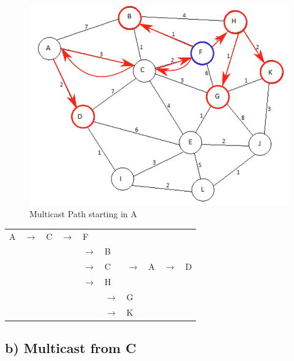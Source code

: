 \documentclass[a4paper, 11 pt, article, accentcolor=tud7b]{tudreport}
\begin{document}
	\begin{figure}[h]
	  	\centering
    	\includegraphics[width=\textwidth/2]{graph-a.pdf}
    	\caption{Multicast Path starting in A}
  	\end{figure}
	\begin{tabular}{llllllllll}
		A & $\rightarrow$ & C & $\rightarrow$ & F & & & & & \\
		& & & & $\rightarrow$ & B & & & &\\
		& & & & $\rightarrow$ & C & $\rightarrow$ & A & $\rightarrow$ & D \\
		& & & & $\rightarrow$ & H & & & & \\
		& & & & & $\rightarrow$ & G & & &\\
		& & & & & $\rightarrow$ & K & & & \\
	\end{tabular}
	
	\subsection*{b) Multicast from C}
	
\end{document}
